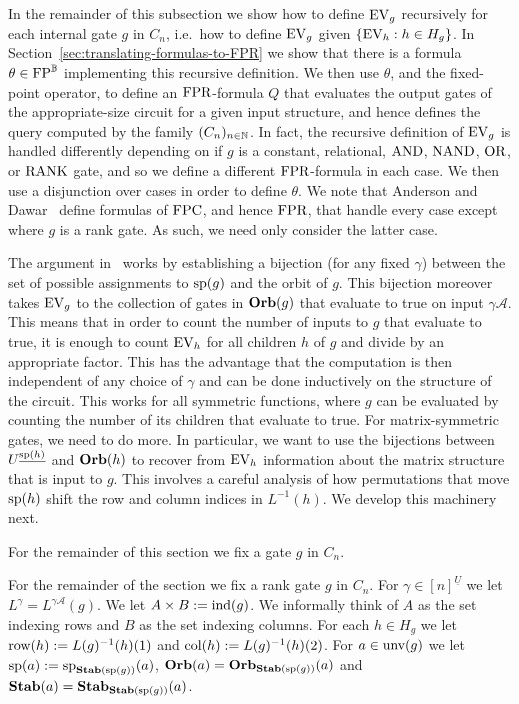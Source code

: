 \documentclass[../main/thesis.tex]{subfiles}
\begin{document}
In the remainder of this subsection we show how to define $\text{EV}_g$ recursively
for each internal gate $g$ in $C_n$, i.e.\ how to define $\text{EV}_g$ given $\{\text{EV}_h
: h \in H_g \}$. In Section~\ref{sec:translating-formulas-to-FPR} we show that
there is a formula $\theta \in \text{\upshape FP}^{\mathbb{B}}$ implementing this recursive
definition. We then use $\theta$, and the fixed-point operator, to define an
$\text{\upshape FPR}$-formula $Q$ that evaluates the output gates of the appropriate-size
circuit for a given input structure, and hence defines the query computed by the
family $(C_n)_{n \in \mathbb{N}}$. In fact, the recursive definition of $\text{EV}_g$ is
handled differently depending on if $g$ is a constant, relational, $\text{\upshape AND}$,
$\text{\upshape NAND}$, $\text{\upshape OR}$, or $\text{\upshape RANK}$ gate, and so we define a different $\text{\upshape FPR}$-formula in
each case. We then use a disjunction over cases in order to define $\theta$. We
note that Anderson and Dawar~\cite{AndersonD17} define formulas of $\text{\upshape FPC}$, and
hence $\text{\upshape FPR}$, that handle every case except where $g$ is a rank gate. As such,
we need only consider the latter case.

The argument in~\cite{AndersonD17} works by establishing a bijection (for any
fixed $\gamma$) between the set of possible assignments to $\text{sp}(g)$ and the
orbit of $g$. This bijection moreover takes $\text{EV}_g$ to the collection of gates
in $\text{\textbf{Orb}}(g)$ that evaluate to true on input $\gamma\mathcal{A}$. This means that
in order to count the number of inputs to $g$ that evaluate to true, it is
enough to count $\text{EV}_h$ for all children $h$ of $g$ and divide by an appropriate
factor. This has the advantage that the computation is then independent of any
choice of $\gamma$ and can be done inductively on the structure of the circuit.
This works for all symmetric functions, where $g$ can be evaluated by counting
the number of its children that evaluate to true. For matrix-symmetric gates, we
need to do more. In particular, we want to use the bijections between
$U^{\underline{\text{sp}(h)}}$ and $\text{\textbf{Orb}}(h)$ to recover from $\text{EV}_h$ information
about the matrix structure that is input to $g$. This involves a careful
analysis of how permutations that move $\text{sp}(h)$ shift the row and column
indices in $L^{-1}(h)$. We develop this machinery next.

For the remainder of this section we fix a gate $g$ in $C_n$.

For the remainder of the section we fix a rank gate $g$ in $C_n$. For $\gamma
\in [n]^{\underline{U}}$ we let $L^{\gamma} = L^{\gamma \mathcal{A}}(g)$. We let
$A \times B := \text{\upshape ind}(g)$. We informally think of $A$ as the set indexing rows and
$B$ as the set indexing columns. For each $h \in H_g$ we let $\text{row}(h) :=
L(g)^{-1}(h)(1)$ and $\text{col}(h) := L(g)^{-1}(h)(2)$. For $a \in \text{unv}(g)$
we let $\text{sp}(a) := \text{sp}_{\text{\textbf{Stab}} (\text{sp} (g))}(a)$, $\text{\textbf{Orb}}(a) = \text{\textbf{Orb}}_{\text{\textbf{Stab}} (\text{sp} (g))}(a)$
and $\text{\textbf{Stab}}(a) = \text{\textbf{Stab}}_{\text{\textbf{Stab}} (\text{sp} (g))}(a)$.
\end{document}
